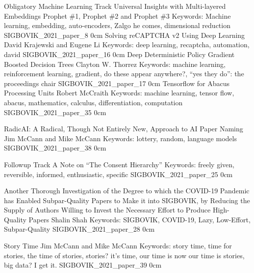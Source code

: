\addtrack
    {}{Obligatory Machine Learning Track}
\addpaper
    {Universal Insights with Multi-layered Embeddings}
    {Prophet \#1, Prophet \#2 and Prophet \#3}
    {Keywords: Machine learning, embedding, auto-encoders, Zalgo he comes, dimensional reduction}
    {SIGBOVIK_2021_paper_8}
    {0cm}
    {}
\addpaper
    {Solving reCAPTCHA v2 Using Deep Learning}
    {David Krajewski and Eugene Li}
    {Keywords: deep learning, recaptcha, automation, david}
    {SIGBOVIK_2021_paper_16}
    {0cm}
    {}
\addpaper
    {Deep Deterministic Policy Gradient Boosted Decision Trees}
    {Clayton W. Thorrez}
    {Keywords: machine learning, reinforcement learning, gradient, do these appear anywhere?, ``yes they do'': the proceedings chair}
    {SIGBOVIK_2021_paper_17}
    {0cm}
    {}
\addpaper
    {Tensorflow for Abacus Processing Units}
    {Robert McCraith}
    {Keywords: machine learning, tensor flow, abacus, mathematics, calculus, differentiation, computation}
    {SIGBOVIK_2021_paper_35}
    {0cm}
    {}


\addpaper
    {RadicAI: A Radical, Though Not Entirely New, Approach to AI Paper Naming}
    {Jim McCann and Mike McCann}
    {Keywords: lottery, random, language models}
    {SIGBOVIK_2021_paper_38}
    {0cm}
    {}

\addtrack
    {}{Followup Track}
\addpaper
    {A Note on ``The Consent Hierarchy''}
    {}
    {Keywords: freely given, reversible, informed, enthusiastic, specific}
    {SIGBOVIK_2021_paper_25}
    {0cm}
    {}

\addpaper
    {Another Thorough Investigation of the Degree to which the COVID-19 Pandemic has Enabled Subpar-Quality Papers to Make it into SIGBOVIK, by Reducing the Supply of Authors Willing to Invest the Necessary Effort to Produce High-Quality Papers}
    {Shalin Shah}
    {Keywords: SIGBOVIK, COVID-19, Lazy, Low-Effort, Subpar-Quality}
    {SIGBOVIK_2021_paper_28}
    {0cm}
    {}

\addpaper
    {Story Time}
    {Jim McCann and Mike McCann}
    {Keywords: story time, time for stories, the time of stories, stories? it's time, our time is now our time is stories, big data? I get it.}
    {SIGBOVIK_2021_paper_39}
    {0cm}
    {}

